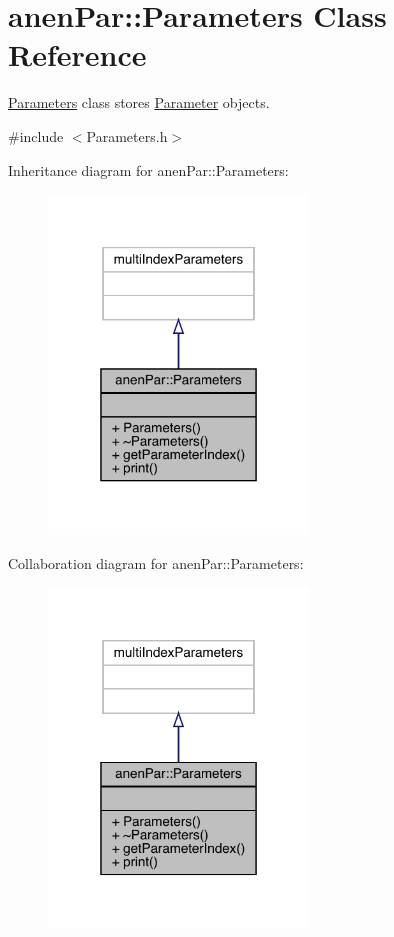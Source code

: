 \hypertarget{classanen_par_1_1_parameters}{}\section{anen\+Par\+:\+:Parameters Class Reference}
\label{classanen_par_1_1_parameters}


\mbox{\hyperlink{classanen_par_1_1_parameters}{Parameters}} class stores \mbox{\hyperlink{classanen_par_1_1_parameter}{Parameter}} objects.  




{\ttfamily \#include $<$Parameters.\+h$>$}



Inheritance diagram for anen\+Par\+:\+:Parameters\+:\nopagebreak
\begin{figure}[H]
\begin{center}
\leavevmode
\includegraphics[width=196pt]{classanen_par_1_1_parameters__inherit__graph}
\end{center}
\end{figure}


Collaboration diagram for anen\+Par\+:\+:Parameters\+:\nopagebreak
\begin{figure}[H]
\begin{center}
\leavevmode
\includegraphics[width=196pt]{classanen_par_1_1_parameters__coll__graph}
\end{center}
\end{figure}
